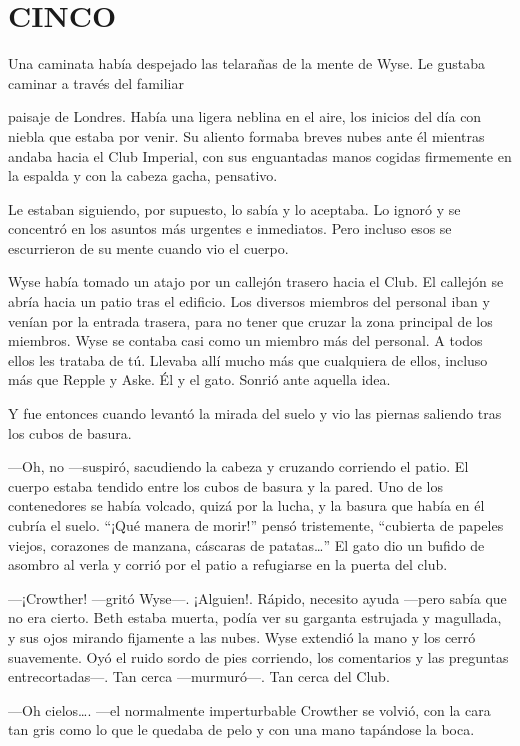 \chapter*{CINCO}

{Una caminata había despejado las telarañas de la mente de Wyse. Le
gustaba caminar a través del familiar}

{paisaje de Londres. Había una ligera neblina en el aire, los inicios
	del día con niebla que estaba por venir. Su aliento formaba breves nubes
	ante él mientras andaba hacia el Club Imperial, con sus enguantadas
	manos cogidas firmemente en la espalda y con la cabeza gacha,
pensativo.}

{Le estaban siguiendo, por supuesto, lo sabía y lo aceptaba. Lo ignoró y
	se concentró en los asuntos más urgentes e inmediatos. Pero incluso esos
se escurrieron de su mente cuando vio el cuerpo.}

{Wyse había tomado un atajo por un callejón trasero hacia el Club. El
	callejón se abría hacia un patio tras el edificio. Los diversos miembros
	del personal iban y venían por la entrada trasera, para no tener que
	cruzar la zona principal de los miembros. Wyse se contaba casi como un
	miembro más del personal. A todos ellos les trataba de tú. Llevaba allí
	mucho más que cualquiera de ellos, incluso más que Repple y Aske. Él y
el gato. Sonrió ante aquella idea.}

{Y fue entonces cuando levantó la mirada del suelo y vio las piernas
saliendo tras los cubos de basura.}

{---Oh, no ---suspiró, sacudiendo la cabeza y cruzando corriendo el
	patio. El cuerpo estaba tendido entre los cubos de basura y la pared.
	Uno de los contenedores se había volcado, quizá por la lucha, y la
	basura que había en él cubría el suelo. ``¡Qué manera de morir!'' pensó
	tristemente, ``cubierta de papeles viejos, corazones de manzana,
	cáscaras de patatas\ldots{}'' El gato dio un bufido de asombro al verla
y corrió por el patio a refugiarse en la puerta del club.}

{---¡Crowther! ---gritó Wyse---. ¡Alguien!. Rápido, necesito ayuda
	---pero sabía que no era cierto. Beth estaba muerta, podía ver su
	garganta estrujada y magullada, y sus ojos mirando fijamente a las
	nubes. Wyse extendió la mano y los cerró suavemente. Oyó el ruido sordo
	de pies corriendo, los comentarios y las preguntas entrecortadas---. Tan
cerca ---murmuró---. Tan cerca del Club.}

{---Oh cielos\ldots{}. ---el normalmente imperturbable Crowther se
	volvió, con la cara tan gris como lo que le quedaba de pelo y con una
mano tapándose la boca.}

